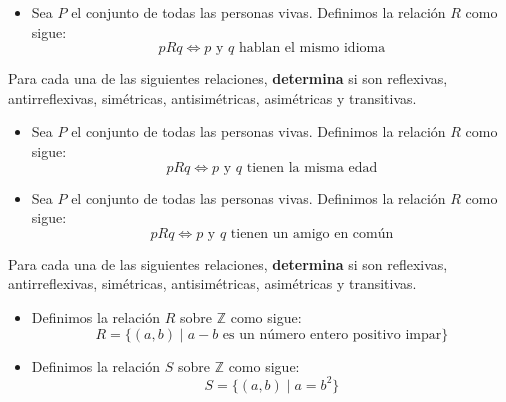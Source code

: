 \documentclass[oneside]{style}
\begin{document}
\begin{questions}[label=\protect\circled{\bfseries\arabic*}]
{\begin{itemize}
            \item Sea $P$ el conjunto de todas las personas vivas. Definimos la 
            relación $R$ como sigue: 
            \begin{equation*}
                pRq\Leftrightarrow p \text{ y } q \text{ hablan el mismo idioma}
            \end{equation*}
        \end{itemize}
    }

    \question
    {
        Para cada una de las siguientes relaciones, \textbf{determina} si son 
        reflexivas, antirreflexivas, simétricas, antisimétricas, asimétricas y 
        transitivas. 
        \begin{itemize}
            \item Sea $P$ el conjunto de todas las personas vivas. Definimos la 
            relación $R$ como sigue: 
            \begin{equation*}
                pRq \Leftrightarrow p \text{ y } q \text{ tienen la misma edad}
            \end{equation*} 

            \item Sea $P$ el conjunto de todas las personas vivas. Definimos la 
            relación $R$ como sigue: 
            \begin{equation*}
                pRq\Leftrightarrow p \text{ y } q \text{ tienen un amigo en común}
            \end{equation*}
        \end{itemize}
    }

    \question
    {
        Para cada una de las siguientes relaciones, \textbf{determina} si son 
        reflexivas, antirreflexivas, simétricas, antisimétricas, asimétricas y 
        transitivas.
        \begin{itemize}
            \item Definimos la relación $R$ sobre $\mathbb{Z}$ como sigue:
            \begin{equation*}
                R = \{(a,b) \; | \; a-b \text{ es un número entero positivo 
                impar}\}
            \end{equation*}

            \item Definimos la relación $S$ sobre $\mathbb{Z}$ como sigue:
            \begin{equation*}
                S = \{(a,b) \; | \; a = b^2\}
            \end{equation*}
        \end{itemize}
    }
\end{questions}
\end{document}
